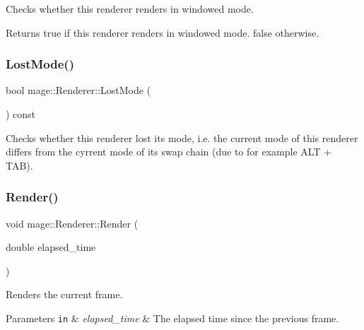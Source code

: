 Checks whether this renderer renders in windowed mode.

\begin{DoxyReturn}{Returns}
{\ttfamily true} if this renderer renders in windowed mode. {\ttfamily false} otherwise. 
\end{DoxyReturn}
\hypertarget{classmage_1_1_renderer_afdde83a1e2bc9288f000fb2575c525d0}{}\label{classmage_1_1_renderer_afdde83a1e2bc9288f000fb2575c525d0} 
\subsubsection{\texorpdfstring{Lost\+Mode()}{LostMode()}}
{\footnotesize\ttfamily bool mage\+::\+Renderer\+::\+Lost\+Mode (\begin{DoxyParamCaption}{ }\end{DoxyParamCaption}) const}

Checks whether this renderer lost its mode, i.\+e. the current mode of this renderer differs from the cyrrent mode of its swap chain (due to for example A\+LT + T\+AB). \hypertarget{classmage_1_1_renderer_a95ac55eb4cc79a5712a50bfb78f67fe6}{}\label{classmage_1_1_renderer_a95ac55eb4cc79a5712a50bfb78f67fe6} 
\subsubsection{\texorpdfstring{Render()}{Render()}}
{\footnotesize\ttfamily void mage\+::\+Renderer\+::\+Render (\begin{DoxyParamCaption}\item[{double}]{elapsed\+\_\+time }\end{DoxyParamCaption})\hspace{0.3cm}{\ttfamily [protected]}}

Renders the current frame.


\begin{DoxyParams}[1]{Parameters}
\mbox{\tt in}  & {\em elapsed\+\_\+time} & The elapsed time since the previous frame. \\
\hline
\end{DoxyParams}
\hypertarget{classmage_1_1_renderer_a95a34b64e815b0e5e95ce539bbd0f5a3}{}\label{classmage_1_1_renderer_a95a34b64e815b0e5e95ce539bbd0f5a3} 

